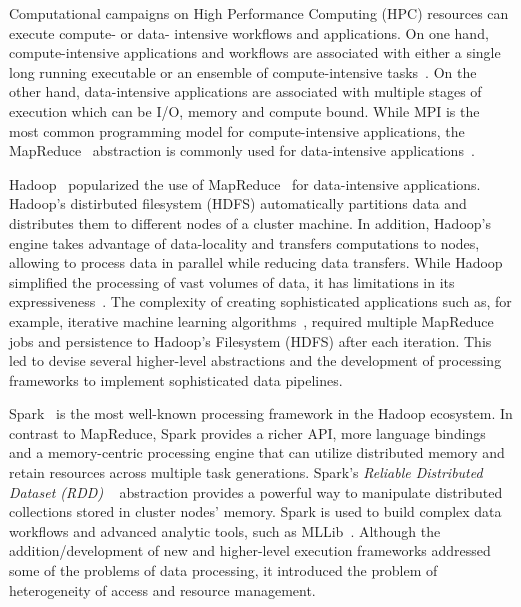 
Computational campaigns on High Performance Computing (HPC) resources can
execute compute- or data- intensive workflows and applications. On one hand,
compute-intensive applications and workflows are associated with either a single
long running executable or an ensemble of compute-intensive
tasks~\cite{balasubramanian2018harnessing}. On the other hand, data-intensive
applications are associated with multiple stages of execution which can be I/O,
memory and compute bound. While MPI is the most common programming model for
compute-intensive applications, the MapReduce~\cite{dean2004mapreduce}
abstraction is commonly used for data-intensive
applications~\cite{hellerstein2012science}.


Hadoop~\cite{hadoop} popularized the use of MapReduce~\cite{dean2004mapreduce}
for data-intensive applications. Hadoop's distirbuted filesystem (HDFS)
automatically partitions data and distributes them to different nodes of a
cluster machine. In addition, Hadoop's engine takes advantage of data-locality
and transfers computations to nodes, allowing to process data in parallel while
reducing data transfers. While Hadoop simplified the processing of vast volumes
of data, it has limitations in its
expressiveness~\cite{yelick2011magellan,isard2007dryad}. The complexity of
creating sophisticated applications such as, for example, iterative machine
learning algorithms~\cite{grolinger2014challenges}, required multiple MapReduce
jobs and persistence to Hadoop's Filesystem (HDFS) after each iteration. This
led to devise several higher-level abstractions and the development of
processing frameworks to implement sophisticated data pipelines.

Spark~\cite{zaharia2010spark} is the most well-known processing framework in the
Hadoop ecosystem. In contrast to MapReduce, Spark provides a richer API, more
language bindings and a memory-centric processing engine that can utilize
distributed memory and retain resources across multiple task generations.
Spark's \emph{Reliable Distributed Dataset (RDD)} ~\cite{zaharia2012resilient}
abstraction provides a powerful way to manipulate distributed collections stored
in cluster nodes' memory. Spark is used to build complex data workflows and
advanced analytic tools, such as MLLib~\cite{mllib}. Although the
addition/development of new and higher-level execution frameworks addressed some
of the problems of data processing, it introduced the problem of heterogeneity
of access and resource management.

